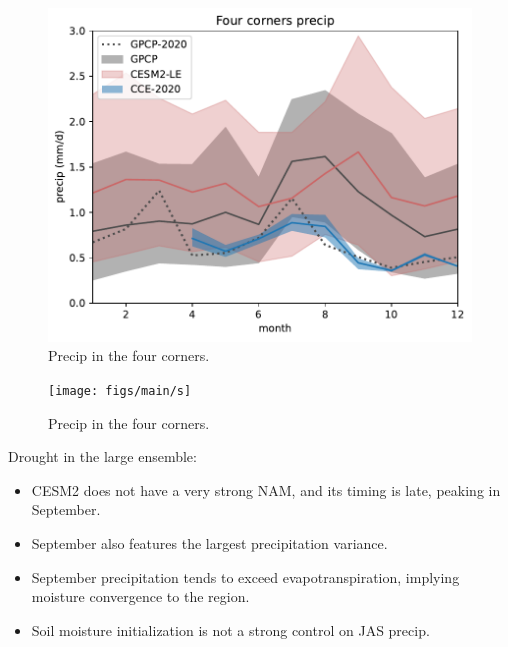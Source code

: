 \documentclass[11pt]{article}
\begin{document}
\begin{figure}[h]
\centering
\includegraphics[width=40pc]{figs/main/precip.pdf}
\caption{Precip in the four corners.}
\label{fig:precip}
\end{figure}


\newpage
\begin{figure}[h]
\centering
\texttt{[image: figs/main/s]}
\caption{Precip in the four corners.}
\label{fig:precip}
\end{figure}



Drought in the large ensemble:
\begin{itemize}
    \item CESM2 does not have a very strong NAM, and its timing is late, peaking in September.
    \item September also features the largest precipitation variance.
    \item September precipitation tends to exceed evapotranspiration, implying moisture convergence to the region. 
    \item Soil moisture initialization is not a strong control on JAS precip.
    
    
\end{itemize}



\nocite{*}

\end{document}

